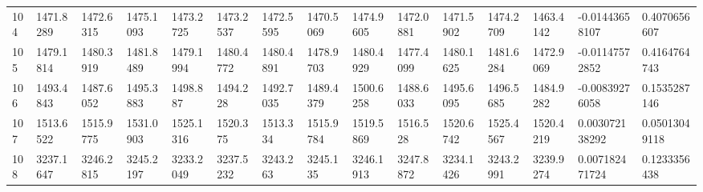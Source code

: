 \begin{landscape}
{\begin{longtable}{@{}lllllllllllllll@{}}
		104                                          & 1471.8289                & 1472.6315                & 1475.1093                & 1473.2725                & 1473.2537                & 1472.5595                & 1470.5069                & 1474.9605                & 1472.0881                & 1471.5902                & 1474.2709                & 1463.4142                & -0.01443658107                                                         & 0.4070656607                                    \\
		105                                          & 1479.1814                & 1480.3919                & 1481.8489                & 1479.1994                & 1480.4772                & 1480.4891                & 1478.9703                & 1480.4929                & 1477.4099                & 1480.1625                & 1481.6284                & 1472.9069                & -0.01147572852                                                         & 0.4164764743                                    \\
		106                                          & 1493.4843                & 1487.6052                & 1495.3883                & 1498.887                 & 1494.228                 & 1492.7035                & 1489.4379                & 1500.6258                & 1488.6033                & 1495.6095                & 1496.5685                & 1484.9282                & -0.00839276058                                                         & 0.1535287146                                    \\
		107                                          & 1513.6522                & 1515.9775                & 1531.0903                & 1525.1316                & 1520.375                 & 1513.334                 & 1515.9784                & 1519.5869                & 1516.528                 & 1520.6742                & 1525.4567                & 1520.4219                & 0.003072138292                                                         & 0.05013049118                                   \\
		108                                          & 3237.1647                & 3246.2815                & 3245.2197                & 3233.2049                & 3237.5232                & 3243.263                 & 3245.135                 & 3246.1913                & 3247.8872                & 3234.1426                & 3243.2991                & 3239.9274                & 0.007182471724                                                         & 0.1233356438                                    \\

\end{longtable}}
\end{landscape}

